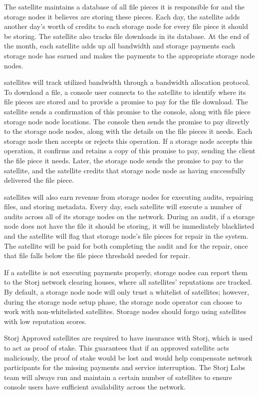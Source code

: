 \documentclass[a4paper,10pt]{article} \usepackage[utf8]{inputenc}
\begin{document}
The satellite maintains a database of all file pieces it is responsible for
and the storage nodes it believes are storing these pieces. Each day, 
the satellite adds another day’s worth 
of credits to each storage node for every file 
piece
it should be storing. The satellite
also tracks file downloads in its database. 
At the end of the month, each satellite
adds up all bandwidth and storage payments each storage node has earned and 
makes
the payments to the appropriate storage node nodes.

satellites will track utilized bandwidth through a bandwidth allocation
protocol. To download a file, a console user connects to the satellite to
identify where its file pieces are stored and to provide a promise to pay for
the file download. The satellite sends a confirmation of this promise 
to the console, along with file piece storage node node locations. 
The console then sends the promise to pay directly
to the storage node nodes, along with the details on the file pieces it needs. 
Each storage node then accepts or rejects this operation. 
If a storage node accepts this
operation, it confirms and retains a copy of this promise to pay, sending the
client the file piece it needs. Later, the storage node sends the promise to 
pay to
the satellite, and the satellite credits that storage node node as having
successfully delivered the file piece.

satellites will also earn revenue from storage nodes for executing audits,
repairing files, and storing metadata. Every day, each satellite will execute
a number of audits across all of its storage nodes on the network. During an 
audit,
if a storage node does not have the file it should be storing, it will be 
immediately
blacklisted and the satellite will flag that storage node’s file pieces for 
repair
in the system. 
The satellite will be paid for both completing the audit 
and for the repair, 
once that file falls below the file piece threshold needed for
repair.

If a satellite is not executing payments properly, storage nodes can report them
to the Storj network clearing houses, where all satellites’ reputations are
tracked. By default, a storage node node will only trust a 
whitelist of satellites; 
however, during the storage node setup phase, the storage node 
operator can choose
to work with non-whitelisted satellites. 
Storage nodes should forgo using satellites with low reputation scores.

Storj Approved satellites are required to have insurance with Storj, 
which is used to act as proof of stake. 
This guarantees that if an approved satellite acts maliciously, 
the proof of stake would
be lost and would help compensate network participants for the missing payments
and service interruption. The Storj Labs team will always run and maintain a
certain number of satellites to ensure console users have sufficient
availability across the network.
\end{document}
